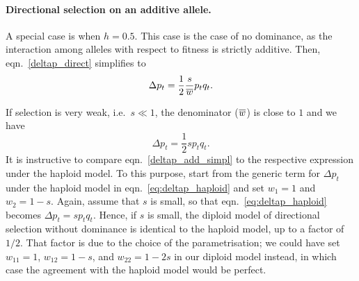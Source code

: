 


\paragraph{Directional selection on an additive allele.}
A special case is when $h = 0.5$. This case is the case of no dominance, as the interaction among alleles with respect to fitness is strictly additive. Then, eqn.\ \eqref{deltap_direct} simplifies to
\begin{equation}
	\Delta p_t = \frac{1}{2}\frac{s}{\overline{w}}p_tq_t .
	\label{deltap_add}
\end{equation}


If selection is very weak, i.e.\ $s \ll 1$, the denominator ($\overline{w}$) is close to $1$ and we have
\begin{equation}
	\Delta p_t = \frac{1}{2} s p_t q_t .
	\label{deltap_add_simpl}
\end{equation}
It is instructive to compare eqn.\ \eqref{deltap_add_simpl} to the respective expression under the haploid model. To this purpose, start from the generic term for $\Delta p_t$ under the haploid model in eqn.\ \eqref{eq:deltap_haploid} and set $w_1 = 1$ and $w_2 = 1-s$. Again, assume that $s$ is small, so that eqn.\ \eqref{eq:deltap_haploid} becomes $\Delta p_t = s p_t q_t$. Hence, if $s$ is small, the diploid model of directional selection without dominance is identical to the haploid model, up to a factor of $1/2$. That factor is due to the choice of the parametrisation; we could have set $w_{11} = 1$, $w_{12} = 1-s$, and $w_{22} = 1-2s$ in our diploid model instead, in which case the agreement with the haploid model would be perfect.\\

